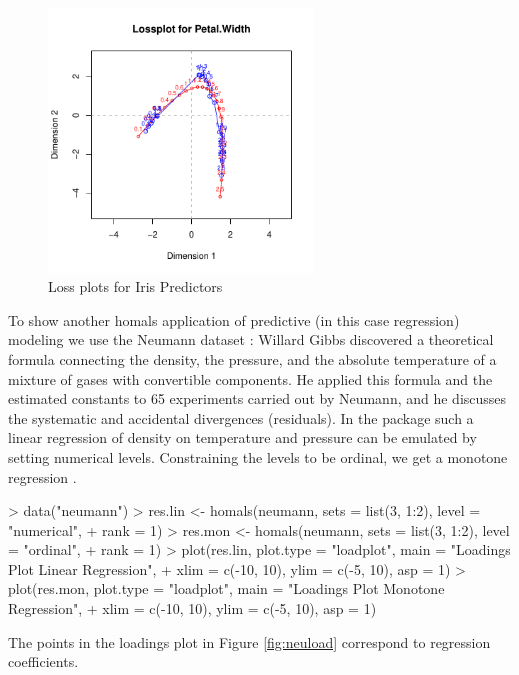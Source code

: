 \documentclass[article, nojss]{jss}
\begin{document}
\begin{figure}[hbt]
\begin{center}
\includegraphics[height=70mm, width=70mm]{irisLoss4.pdf}
\caption{\label{fig:irisLoss}Loss plots for Iris Predictors}
\end{center}
\end{figure}

To show another homals application of predictive (in this case regression) modeling we use the Neumann dataset \citep{Wilson:26}: Willard Gibbs discovered a theoretical formula connecting the density, the pressure, and the absolute temperature of a mixture of gases with convertible 
components. He applied this formula and the estimated constants to 65 experiments carried out by Neumann, and he discusses the systematic and accidental divergences (residuals). In the  package such a linear regression of density on temperature and pressure can be emulated by setting numerical levels. Constraining the levels to be ordinal, we get a monotone regression \citep{Gifi:90}. 

\begin{Schunk}
\begin{Sinput}
> data("neumann")
> res.lin <- homals(neumann, sets = list(3, 1:2), level = "numerical", 
+     rank = 1)
> res.mon <- homals(neumann, sets = list(3, 1:2), level = "ordinal", 
+     rank = 1)
> plot(res.lin, plot.type = "loadplot", main = "Loadings Plot Linear Regression", 
+     xlim = c(-10, 10), ylim = c(-5, 10), asp = 1)
> plot(res.mon, plot.type = "loadplot", main = "Loadings Plot Monotone Regression", 
+     xlim = c(-10, 10), ylim = c(-5, 10), asp = 1)
\end{Sinput}
\end{Schunk}

The points in the loadings plot in Figure \ref{fig:neuload} correspond to regression coefficients.
\end{document}
